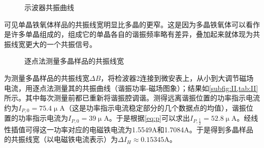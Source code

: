 \begin{figure}[htbp]
		\caption{示波器共振曲线}
	\end{figure}
	可见单晶铁氧体样品的共振线宽明显比多晶的更窄。这是因为多晶铁氧体可以看作是许多单晶组成的，组成它的单晶各自的谐振频率略有差异，叠加起来就体现为共振线宽更大的一个共振信号。
	\begin{figure}[htbp]
		\caption{逐点法测量多晶样品的共振线宽}
	\end{figure}
	
	
	\par 为测量多晶样品的共振线宽$\Delta B$，将检波器2连接到微安表上，从小到大调节磁场电流，用逐点法测量其的共振曲线（谐振功率-磁场图象）；结果如\cref{subfig:II,tab:II}所示。其中每次测量前都已重新将谐振腔调谐。测得远离谐振位置的功率指示电流约为$I_{P,0}=75.4\upmu$A（这是功率指示电流稳定部分的几个数据点的均值），谐振位置的功率指示电流为$I_{P,0}=39\upmu$A。于是根据\cref{eq:p}可以求出$I_{P,\frac{1}{2}}=52.8\upmu$A。经线性插值可得这一功率对应的电磁铁电流为1.5549A和1.7084A。于是得到多晶样品的共振线宽（以电磁铁电流表示）为$\Delta I_{H}\approx 0.15345$A。
